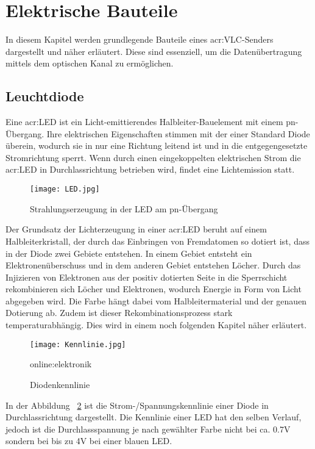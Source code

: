 \section{Elektrische Bauteile}
\label{subsec:elbau}
In diesem Kapitel werden grundlegende Bauteile eines \gls{acr:VLC}-Senders dargestellt und näher erläutert. Diese sind essenziell, um die Datenübertragung mittels dem optischen Kanal zu ermöglichen.

\subsection{Leuchtdiode}
\label{sub:led}

Eine \gls{acr:LED} ist ein Licht-emittierendes Halbleiter-Bauelement mit einem pn-Übergang. Ihre elektrischen Eigenschaften stimmen mit der einer Standard Diode überein, wodurch sie in nur eine Richtung leitend ist und in die entgegengesetzte Stromrichtung sperrt. Wenn durch einen eingekoppelten elektrischen Strom die \gls{acr:LED} in Durchlassrichtung betrieben wird, findet eine Lichtemission statt.\cite{slabke} 

\begin{figure}[H]
	\centering
	\texttt{[image: LED.jpg]}
	\caption[Strahlungserzeugung in der LED am pn-Übergang]{Strahlungserzeugung in der LED am pn-Übergang} \cite{slabke}
	\label{fig:LED}
\end{figure}

Der Grundsatz der Lichterzeugung in einer \gls{acr:LED} beruht auf einem Halbleiterkristall, der durch das Einbringen von Fremdatomen so dotiert ist, dass in der Diode zwei Gebiete entstehen. In einem Gebiet entsteht ein Elektronenüberschuss und in dem anderen Gebiet entstehen Löcher. Durch das Injizieren von Elektronen aus der positiv dotierten Seite in die Sperrschicht rekombinieren sich Löcher und Elektronen, wodurch Energie in Form von Licht abgegeben wird.\cite{slabke} Die Farbe hängt dabei vom Halbleitermaterial und der genauen Dotierung ab. Zudem ist dieser Rekombinationsprozess stark temperaturabhängig. Dies wird in einem noch folgenden Kapitel näher erläutert.

\begin{figure}[H]
	\centering
	\texttt{[image: Kennlinie.jpg]}
	\caption[Diodenkennlinie]{Diodenkennlinie} 
	\gls{online:elektronik}
	\label{fig:Kennlinie}
\end{figure}


In der Abbildung ~\ref{fig:Kennlinie} ist die Strom-/Spannungskennlinie einer Diode in Durchlassrichtung
dargestellt. Die Kennlinie einer LED hat den selben Verlauf, jedoch ist die Durchlassspannung
je nach gewählter Farbe nicht bei ca. 0.7V sondern bei bis zu 4V bei
einer blauen LED. 

